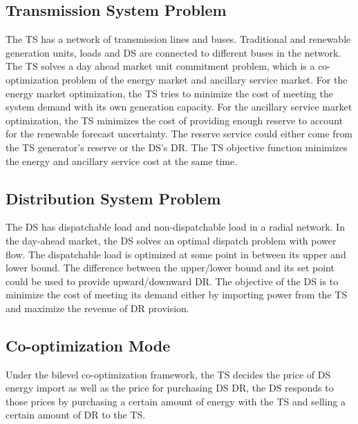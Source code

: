 
\subsection{Transmission System Problem}
The TS has a network of transmission lines and buses. Traditional and renewable generation units, loads and DS are connected to different buses in the network. The TS solves a day ahead market unit commitment problem, which is a co-optimization problem of the energy market and ancillary service market. For the energy market optimization, the TS tries to minimize the cost of meeting the system demand with its own generation capacity. For the ancillary service market optimization, the TS minimizes the cost of providing enough reserve to account for the renewable forecast uncertainty. The reserve service could either come from the TS generator's reserve or the DS's DR. The TS objective function minimizes the energy and ancillary service cost at the same time.  

\subsection{Distribution System Problem}
The DS has dispatchable load and non-dispatchable load in a radial network. In the day-ahead market, the DS solves an optimal dispatch problem with power flow. The dispatchable load is optimized at some point in between its upper and lower bound. The difference between the upper/lower bound and its set point could be used to provide upward/downward DR. The objective of the DS is to minimize the cost of meeting its demand either by importing power from the TS and maximize the revenue of DR provision.

\subsection{Co-optimization Mode}
Under the bilevel co-optimization framework, the TS decides the price of DS energy import as well as the price for purchasing DS DR, the DS responds to those prices by purchasing a certain amount of energy with the TS and selling a certain amount of DR to the TS.


